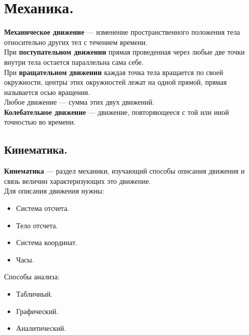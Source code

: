 \documentclass{article}
\begin{document}
	\tableofcontents
	\setcounter{tocdepth}{3}
	\newpage
	\section{Механика.}
	\textbf{Механическое движение} --- изменение пространственного положения тела относительно других тел с течением времени. \\
	При \textbf{поступательном движении} прямая проведенная через любые две точки внутри тела остается параллельна сама себе. \\
	При \textbf{вращательном движении} каждая точка тела вращается по своей окружности, центры этих окружностей лежат на одной прямой, прямая называется осью вращения. \\
	Любое движение --- сумма этих двух движений. \\
	\textbf{Колебательное движение} --- движение, повторяющееся с той или иной точностью во времени.
	\subsection{Кинематика.}
	\textbf{Кинематика} --- раздел механики, изучающий способы описания движения и связь величин характеризующих это движение. \\
	Для описания движения нужны:
	\begin{itemize}
		\item Система отсчета.
		\item Тело отсчета.
		\item Система координат.
		\item Часы.
	\end{itemize}
	Способы анализа:
	\begin{itemize}
		\item Табличный.
		\item Графический.
		\item Аналитический.
	\end{itemize}
\end{document}
